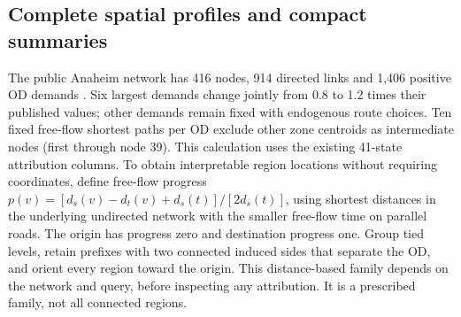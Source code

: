 \subsection{Complete spatial profiles and compact summaries}\label{sec:anaheim}
The public Anaheim network has 416 nodes, 914 directed links and 1,406 positive OD demands \citep{tnfrc2024transportation}. Six largest demands change jointly from 0.8 to 1.2 times their published values; other demands remain fixed with endogenous route choices. Ten fixed free-flow shortest paths per OD exclude other zone centroids as intermediate nodes (first through node 39). This calculation uses the existing 41-state attribution columns.
To obtain interpretable region locations without requiring coordinates, define free-flow progress $p(v)=[d_s(v)-d_t(v)+d_s(t)]/[2d_s(t)]$, using shortest distances in the underlying undirected network with the smaller free-flow time on parallel roads. The origin has progress zero and destination progress one. Group tied levels, retain prefixes with two connected induced sides that separate the OD, and orient every region toward the origin. This distance-based family depends on the network and query, before inspecting any attribution. It is a prescribed family, not all connected regions.

